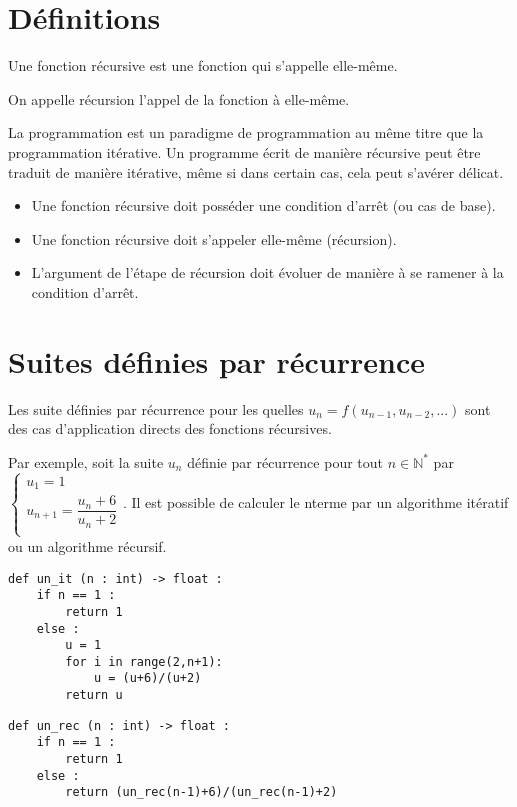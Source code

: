 \section{Définitions}
\begin{defi}%
Une fonction récursive est une fonction qui s'appelle elle-même.

On appelle récursion l'appel de la fonction à elle-même.
\end{defi}

La programmation est un paradigme de programmation au même titre que la programmation itérative. Un programme écrit de manière récursive peut être traduit de manière itérative, même si dans certain cas, cela peut s'avérer délicat.


\begin{methode}
\begin{itemize}
\item Une fonction récursive doit posséder une condition d'arrêt (ou cas de base).
\item Une fonction récursive doit s'appeler elle-même (récursion).
\item L'argument de l'étape de récursion doit évoluer de manière à se ramener à la condition d'arrêt.
\end{itemize}
\end{methode}
 
 



\section{Suites définies par récurrence}

Les suite définies par récurrence pour les quelles $u_{n}=f\left(u_{n-1},u_{n-2},...\right)$ sont des cas d'application directs des fonctions récursives. 

Par exemple, soit la suite $u_n$ définie par récurrence pour tout $n\in\mathbb{N}^*$ par 
$
\left\{
\begin{array}{ll} 
u_1 = 1 \\
u_{n+1} = \dfrac{u_n + 6}{u_n + 2} \\
\end{array}
\right.
$. Il est possible de calculer le n\ieme terme par un algorithme itératif ou un algorithme récursif. 

\noindent\begin{minipage}[c]{.45\linewidth}
\begin{lstlisting}
def un_it (n : int) -> float :
    if n == 1 :
        return 1
    else : 
        u = 1
        for i in range(2,n+1):
            u = (u+6)/(u+2)
        return u
\end{lstlisting}
\end{minipage} \hfill
\begin{minipage}[c]{.45\linewidth}
\begin{lstlisting}
def un_rec (n : int) -> float :
    if n == 1 :
        return 1
    else : 
        return (un_rec(n-1)+6)/(un_rec(n-1)+2)
\end{lstlisting}
\end{minipage} 

